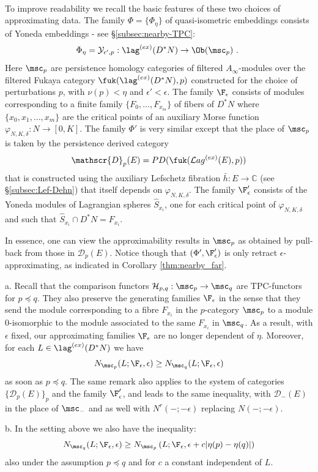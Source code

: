 \

To improve readability we recall the basic features of these two choices of approximating data.
The family $\Phi=\{\Phi_{\eta}\}$ of quasi-isometric embeddings 
consists of Yoneda embeddings - see \S\ref{subsec:nearby-TPC}:
$$\Phi_{\eta}= \mathcal{Y}_{\epsilon', p}: \lag^{(ex)}(D^{\ast}N)\to \Ob (\msc_{p})~.~$$ 
Here  $\msc_{p}$ are persistence homology categories of filtered $A_{\infty}$-modules over the filtered 
Fukaya category $\fuk(\lag^{(ex)}(D^{\ast}N), p)$ constructed for the choice of perturbations $p$, with $\nu(p) < \eta$ and $\epsilon'<\epsilon$. 
The family $\F_{\epsilon}$ consists of modules corresponding to a finite family 
$\{ F_{0},\ldots,  F_{x_{m}}\}$ of fibers of $D^{\ast}N$ where $\{ x_{0},x_{1},\ldots, x_{m}\}$ are the critical points of an auxiliary Morse function 
$\varphi_{N,K,\delta}:N\to [0, K]$.
The family $\Phi'$ is very similar except that the place of $\msc_{p}$ is taken  by the persistence derived category 
$$\mathscr{D}_{p}(E)=PD(\fuk(\mathcal{L}ag^{(ex)}(E), p))$$
that is constructed using the auxiliary Lefschetz fibration $\bar{h}:E\to \mathbb{C}$ (see \S\ref{subsec:Lef-Dehn})
 that itself depends on $\varphi_{N,K,\delta}$. The family $\F'_{\epsilon}$ consists of the Yoneda modules of 
Lagrangian spheres $\hat{S}_{x_{i}}$, one for each critical point of $\varphi_{N,K,\delta}$ and such that
$\hat{S}_{x_{i}}\cap D^{\ast}N=F_{x_{i}}$.

In essence, one can view the approximability results in $\msc_{p}$ as obtained by pull-back from those
in $\mathscr{D}_{p}(E)$. Notice though that $(\Phi',\F'_{\epsilon})$  is only  retract $\epsilon$-approximating,  as indicated in Corollary  \ref{thm:nearby_far}.

\begin{rem}\label{rem:coherence}
a. Recall that the comparison functors $\mathcal{H}_{p,q}:\msc_{p}\to \msc_{q}$ are TPC-functors for $p \preceq q$.  
They also preserve the generating families $\F_{\epsilon}$  in the sense that they send
the module  corresponding to a fibre $F_{x_{i}}$ in the $p$-category $\msc_{p}$ to a module $0$-isomorphic to the  module associated to the same $F_{x_{i}}$ in $\msc_{q}$.  As a result, with $\epsilon$ fixed, our approximating families
$\F_{\epsilon}$ are no longer dependent of $\eta$. Moreover, for each $L\in \lag^{(ex)}(D^{\ast}N)$
we have $$N_{\msc_{p}}(L;\F_{\epsilon}, \epsilon)\geq  N_{\msc_{q}}(L;\F_{\epsilon}, \epsilon)$$
as soon as $p\preceq q$. The same remark also applies to the system of categories $\{\mathscr{D}_{p}(E)\}_{p}$ and
the family $\F'_{\epsilon}$, and leads to the same inequality, with $\mathscr{D}_{-}(E)$ in the place of $\msc_{-}$ and as well with $N^{r}(-;-\epsilon)$ replacing $N(-;-\epsilon)$.

b. In the setting above we also have the inequality:
$$N_{\msc_{q}}(L;\F_{\epsilon}, \epsilon)\geq  N_{\msc_{p}}\left(L;\F_{\epsilon}, \epsilon + c |\eta(p)-\eta(q)|\right)$$ also under the assumption
$p\preceq q$ and for $c$ a constant independent of $L$. 
\end{rem}


